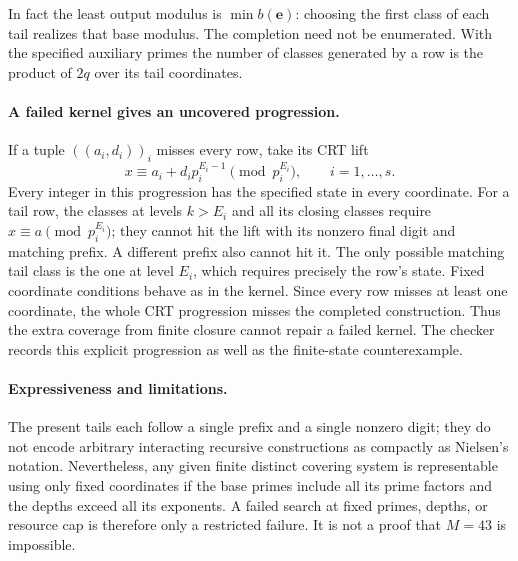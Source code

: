 \documentclass[11pt]{article}
\begin{document}
In fact the least output modulus is $\min b(\mathbf e)$: choosing the
first class of each tail realizes that base modulus. The completion need
not be enumerated. With the specified auxiliary primes the number of classes
generated by a row is the product of $2q$ over its tail coordinates.

\paragraph{A failed kernel gives an uncovered progression.}
If a tuple $((a_i,d_i))_i$ misses every row, take its CRT lift
\[
 x\equiv a_i+d_i p_i^{E_i-1}\pmod {p_i^{E_i}},\qquad i=1,\ldots,s.
\]
Every integer in this progression has the specified state in every coordinate.
For a tail row, the classes at levels $k>E_i$ and all its closing classes
require $x\equiv a\pmod {p_i^{E_i}}$; they cannot hit the lift with its
nonzero final digit and matching prefix. A different prefix also cannot hit
it. The only possible matching tail class is the one at level $E_i$, which
requires precisely the row's state. Fixed coordinate conditions behave as in
the kernel. Since every row misses at least one coordinate, the whole CRT
progression misses the completed construction. Thus the extra coverage from
finite closure cannot repair a failed kernel. The checker records this
explicit progression as well as the finite-state counterexample.

\paragraph{Expressiveness and limitations.}
The present tails each follow a single prefix and a single nonzero digit;
they do not encode arbitrary interacting recursive constructions as compactly
as Nielsen's notation. Nevertheless, any given finite distinct covering
system is representable using only fixed coordinates if the base primes
include all its prime factors and the depths exceed all its exponents.
A failed search at fixed primes, depths, or resource cap is therefore only
a restricted failure. It is not a proof that $M=43$ is impossible.
\end{document}
